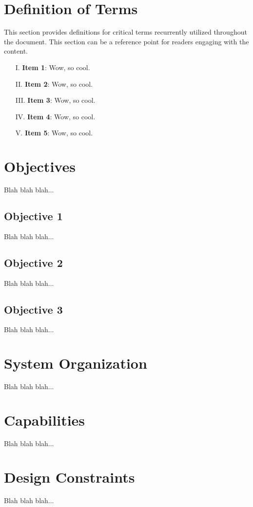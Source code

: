 \documentclass{article}
\begin{document}
\section{Definition of Terms}
This section provides definitions for critical terms recurrently utilized throughout the document. This section can be a reference point for readers engaging with the content.

\begin{enumerate}
    \item[I.] \textbf{Item 1}: Wow, so cool.
    \item[II.] \textbf{Item 2}: Wow, so cool.
    \item[III.] \textbf{Item 3}: Wow, so cool.
    \item[IV.] \textbf{Item 4}: Wow, so cool.
    \item[V.] \textbf{Item 5}: Wow, so cool.
\end{enumerate}

\section{Objectives}
Blah blah blah...

\subsection{Objective 1}
Blah blah blah...

\subsection{Objective 2}
Blah blah blah...

\subsection{Objective 3}
Blah blah blah...

\section{System Organization}
Blah blah blah...

\section{Capabilities}
Blah blah blah...

\section{Design Constraints}
Blah blah blah...

\newpage

\printbibliography

{\parindent0pt}
\end{document}
